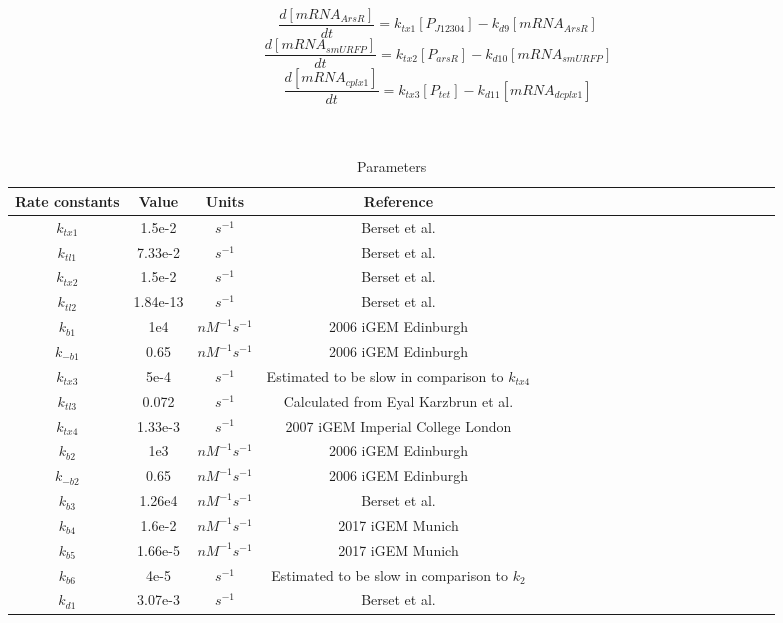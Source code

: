 \begin{equation}
	\frac{d[mRNA_{ArsR}]}{dt}=k_{tx1}[P_{J12304}]-k_{d9}[mRNA_{ArsR}] \tag{13}
\end{equation}
\begin{equation}
	\frac{d[mRNA_{smURFP}]}{dt}=k_{tx2}[P_{arsR}]-k_{d10}[mRNA_{smURFP}] \tag{14}
\end{equation}
\begin{equation}
	\frac{d[mRNA_{cplx1}]}{dt}=k_{tx3}[P_{tet}]-k_{d11}[mRNA_{dcplx1}] \tag{15}
\end{equation}
\\\\
\begin{table}[htbp]
	\centering
	\caption{\label {tab:test} Parameters}
	\begin{tabular}{ccccccccccccccccccccc}
		\toprule
		Rate constants & Value& Units & Reference \\
		\midrule
		$k_{tx1}$ & 1.5e-2&$s^{-1} $& Berset et al.\cite{berset2017mechanistic} \\
		$k_{tl1}$ & 7.33e-2 &$s^{-1} $& Berset et al.\\
		$k_{tx2}$ & 1.5e-2 & $s^{-1}$ & Berset et al.\\
		$k_{tl2} $&1.84e-13&$s^{-1}$& Berset et al.\\
		$k_{b1} $& 1e4   & $nM^{-1}s^{-1}$ &2006 iGEM Edinburgh  \\
		$k_{-b1}$ & 0.65    & $nM^{-1}s^{-1}$ &2006 iGEM Edinburgh   \\
		$k_{tx3}$& 5e-4 &$s^{-1}$&Estimated to be slow in comparison to $k_{tx4} $\\
		$k_{tl3} $& 0.072   & $s^{-1}$ & Calculated from Eyal Karzbrun et al.\cite{karzbrun2011coarse}  \\
		$k_{tx4} $& 1.33e-3 &$s^{-1}$&2007 iGEM Imperial College London \\
		$k_{b2} $& 1e3   & $nM^{-1}s^{-1}$ &2006 iGEM Edinburgh  \\
		$k_{-b2} $& 0.65    & $nM^{-1}s^{-1}$ &2006 iGEM Edinburgh   \\
		$k_{b3}  $&1.26e4  &$nM^{-1}s^{-1}$ &  Berset et al. \\
		$k_{b4}$&1.6e-2& $nM^{-1}s^{-1}$& 2017 iGEM Munich\\
		$k_{b5} $&1.66e-5&$nM^{-1}s^{-1}$&  2017 iGEM Munich\\ 
		$k_{b6}$&4e-5&$s^{-1} $& Estimated to be slow in comparison to $k_{2}$\\
		$k_{d1} $& 3.07e-3&$s^{-1} $ & Berset et al.\\

\end{tabular}
\end{table}
